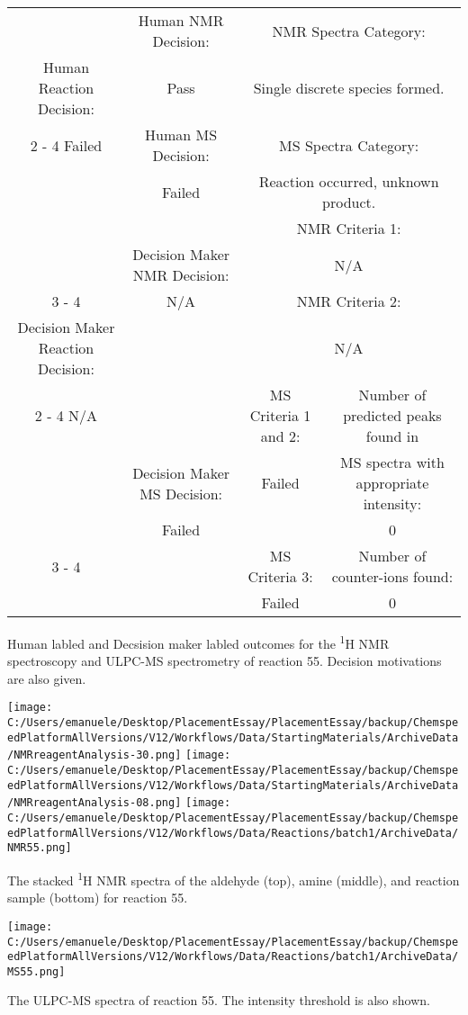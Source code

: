 \documentclass{article}%
\begin{document}
\begin{Decision Table}[H]%
\begin{tabular}{|c|c|c|c|}%
\hline%
&Human NMR Decision:&\multicolumn{2}{|c|}{NMR Spectra Category:}\\%
Human Reaction Decision:&Pass&\multicolumn{2}{|c|}{Single discrete species formed.}\\%
\cline{2%
-%
4}%
Failed&Human MS Decision:&\multicolumn{2}{|c|}{MS Spectra Category:}\\%
&Failed&\multicolumn{2}{|c|}{Reaction occurred, unknown product.}\\%
\hline%
&&\multicolumn{2}{|c|}{NMR Criteria 1:}\\%
&Decision Maker NMR Decision:&\multicolumn{2}{|c|}{N/A}\\%
\cline{3%
-%
4}%
&N/A&\multicolumn{2}{|c|}{NMR Criteria 2:}\\%
Decision Maker Reaction Decision:&&\multicolumn{2}{|c|}{N/A}\\%
\cline{2%
-%
4}%
N/A&&MS Criteria 1 and 2:&Number of predicted peaks found in\\%
&Decision Maker MS Decision:&Failed&MS spectra with appropriate intensity:\\%
&Failed&&0\\%
\cline{3%
-%
4}%
&&MS Criteria 3:&Number of counter{-}ions found:\\%
&&Failed&0\\%
\hline%
\end{tabular}%
\caption{Human labled and Decsision maker labled outcomes for the \textsuperscript{1}H NMR spectroscopy and ULPC-MS spectrometry of reaction 55. Decision motivations are also given.}%
\end{Decision Table}%
\begin{NMR Spectra}[H]%
\begin{center}%
\texttt{[image: C:/Users/emanuele/Desktop/PlacementEssay/PlacementEssay/backup/ChemspeedPlatformAllVersions/V12/Workflows/Data/StartingMaterials/ArchiveData/NMRreagentAnalysis-30.png]}\hfill%
\texttt{[image: C:/Users/emanuele/Desktop/PlacementEssay/PlacementEssay/backup/ChemspeedPlatformAllVersions/V12/Workflows/Data/StartingMaterials/ArchiveData/NMRreagentAnalysis-08.png]}\hfill%
\texttt{[image: C:/Users/emanuele/Desktop/PlacementEssay/PlacementEssay/backup/ChemspeedPlatformAllVersions/V12/Workflows/Data/Reactions/batch1/ArchiveData/NMR55.png]}\hfill%
\end{center}%
\caption{The stacked \textsuperscript{1}H NMR spectra of the aldehyde (top), amine (middle), and reaction sample (bottom) for reaction 55.}%
\end{NMR Spectra}%
\begin{MS Spectra}[H]%
\begin{center}%
\texttt{[image: C:/Users/emanuele/Desktop/PlacementEssay/PlacementEssay/backup/ChemspeedPlatformAllVersions/V12/Workflows/Data/Reactions/batch1/ArchiveData/MS55.png]}\hfill%
\end{center}%
\caption{The ULPC-MS spectra of reaction 55. The intensity threshold is also shown.}%
\end{MS Spectra}%
\end{document}
